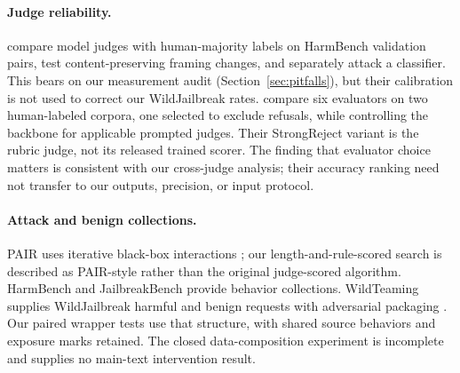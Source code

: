 \paragraph{Judge reliability.} \citet{gao2026judge} compare model judges with human-majority labels on HarmBench validation pairs, test content-preserving framing changes, and separately attack a classifier. This bears on our measurement audit (Section~\ref{sec:pitfalls}), but their calibration is not used to correct our WildJailbreak rates. \citet{mu2026evaluators} compare six evaluators on two human-labeled corpora, one selected to exclude refusals, while controlling the backbone for applicable prompted judges. Their StrongReject variant is the rubric judge, not its released trained scorer. The finding that evaluator choice matters is consistent with our cross-judge analysis; their accuracy ranking need not transfer to our outputs, precision, or input protocol.

\paragraph{Attack and benign collections.} PAIR uses iterative black-box interactions \citep{chao2023pair}; our length-and-rule-scored search is described as PAIR-style rather than the original judge-scored algorithm. HarmBench \citep{mazeika2024harmbench} and JailbreakBench \citep{chao2024jbb} provide behavior collections. WildTeaming supplies WildJailbreak harmful and benign requests with adversarial packaging \citep{jiang2024wildteaming}. Our paired wrapper tests use that structure, with shared source behaviors and exposure marks retained. The closed data-composition experiment is incomplete and supplies no main-text intervention result.
